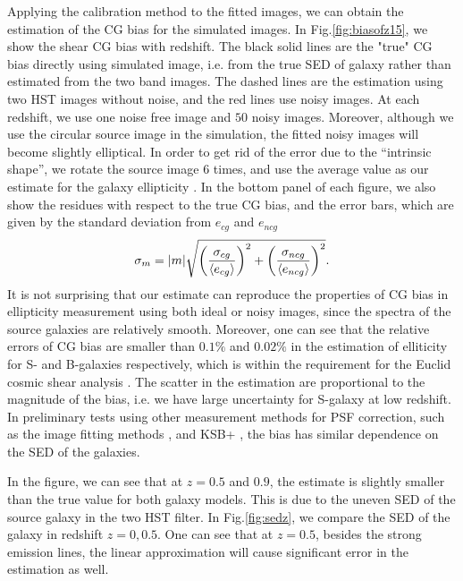 \documentclass[useAMS,usenatbib]{mn2e}
\newcommand{\be}{\begin{equation}}
\newcommand{\ee}{\end{equation}}
\newcommand{\rund}[1]{\left(#1\right)}
\def\elabel#1{\label{eq:#1}}
\begin{document}
Applying the calibration method to the fitted images, we can obtain
the estimation of the CG bias for the simulated images. In
Fig.\ref{fig:biasofz15}, we show the shear CG bias with redshift. The
black solid lines are the "true" CG bias directly using simulated
image, i.e. from the true SED of galaxy rather than estimated from the two
band images. The dashed lines are the estimation using two HST images
without noise, and the red lines use noisy images. At
each redshift, we use one noise free image and $50$ noisy
images. Moreover, although we use the circular source image in the
simulation, the fitted noisy images will become slightly
elliptical. In order to get rid of the error due to the ``intrinsic
shape'', we rotate the source image $6$ times, and use the average
value as our estimate for the galaxy ellipticity
\citep{2007AJ....133.1763N}. In the bottom panel of each figure, we
also show the residues with respect to the true CG bias, and the error
bars, which are given by the standard deviation from $e_{cg}$ and
$e_{ncg}$
%
\be
\sigma_m= |m| \sqrt{\rund{\sigma_{cg} \over \langle e_{cg}\rangle }^2
  + \rund{\sigma_{ncg} \over \langle e_{ncg} \rangle}^2 }.
\elabel{sigmam}
\ee
%
It is not surprising that our estimate can reproduce the properties of
CG bias in ellipticity measurement using both ideal or noisy images,
since the spectra of the source galaxies are relatively smooth.
Moreover, one can see that the relative errors of CG bias are smaller
than $0.1\%$ and $0.02\%$ in the estimation of elliticity for S- and
B-galaxies respectively, which is within the requirement for the
Euclid cosmic shear analysis \citep[$1\times
  10^{-3}$][]{2013MNRAS.431.3103C,2013MNRAS.429..661M}. The scatter
in the estimation are proportional to the magnitude of the bias,
i.e.  we have large uncertainty for S-galaxy at low redshift.
In preliminary tests using other measurement methods for PSF
correction, such as the image fitting methods
\citep[e.g.][]{2007MNRAS.382..315M,2008MNRAS.390..149K,2013MNRAS.429.2858M},
and KSB+ \citep[e.g.][]{1998ApJ...504..636H,2006MNRAS.368.1323H}, the
bias has similar dependence on the SED of the galaxies.


In the figure, we can see that at $z=0.5$ and $0.9$, the estimate is
slightly smaller than the true value for both galaxy models. This is
due to the uneven SED of the source galaxy in the two HST filter.  In
Fig.\ref{fig:sedz}, we compare the SED of the galaxy in redshift
$z=0,0.5$. One can see that at $z=0.5$, besides the strong emission
lines, the linear approximation will cause significant error in the
estimation as well.
\end{document}
